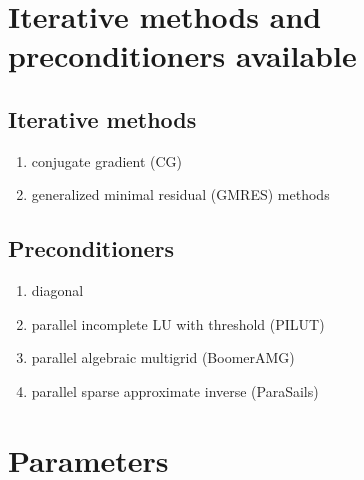 \section{Iterative methods and preconditioners available}

\subsection{Iterative methods}

\begin{enumerate}
\item conjugate gradient (CG)
\item generalized minimal residual (GMRES) methods
\end{enumerate}

\subsection{Preconditioners}

\begin{enumerate}
\item diagonal
\item parallel incomplete LU with threshold (PILUT)
\item parallel algebraic multigrid (BoomerAMG)
\item parallel sparse approximate inverse (ParaSails)
\end{enumerate}


\section{Parameters}
\label{sec:fei-param}

